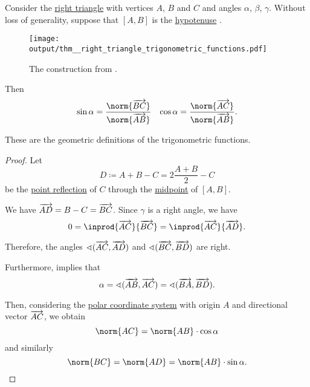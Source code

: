 \begin{proposition}\label{thm:right_triangle_trigonometric_functions}
  Consider the \hyperref[def:triangle/right]{right triangle} with vertices \( A \), \( B \) and \( C \) and angles \( \alpha \), \( \beta \), \( \gamma \). Without loss of generality, suppose that \( [A, B] \) is the \hyperref[thm:right_triangle]{hypotenuse} .

  \begin{figure}[!ht]
    \centering
    \texttt{[image: output/thm\_\_right\_triangle\_trigonometric\_functions.pdf]}
    \caption{The construction from .}\label{fig:thm:right_triangle_trigonometric_functions}
  \end{figure}

  Then
  \begin{align*}
    \sin \alpha = \frac {\norm{\vect{BC}}} {\norm{\vect{AB}}}
    &&
    \cos \alpha = \frac {\norm{\vect{AC}}} {\norm{\vect{AB}}}.
  \end{align*}

  These are the geometric definitions of the trigonometric functions.
\end{proposition}
\begin{proof}
  Let
  \begin{equation*}
    D \coloneqq A + B - C = 2 \frac {A + B} 2 - C
  \end{equation*}
  be the \hyperref[def:rigid_motion/point_reflection]{point reflection} of \( C \) through the \hyperref[def:midpoint]{midpoint} of \( [A, B] \).

  We have \( \overrightarrow{AD} = B - C = \overrightarrow{BC} \). Since \( \gamma \) is a right angle, we have
  \begin{equation*}
    0
    =
    \inprod{\vect{AC}} {\vect{BC}}
    =
    \inprod{\vect{AC}} {\vect{AD}}.
  \end{equation*}

  Therefore, the angles \( \sphericalangle(\overrightarrow{AC},\overrightarrow{AD}) \) and \( \sphericalangle(\overrightarrow{BC},\overrightarrow{BD}) \) are right.

  Furthermore,  implies that
  \begin{equation*}
    \alpha = \sphericalangle(\overrightarrow{AB},\overrightarrow{AC}) = \sphericalangle(\overrightarrow{BA},\overrightarrow{BD}).
  \end{equation*}

  Then, considering the \hyperref[rem:polar_coordinate_system]{polar coordinate system} with origin \( A \) and directional vector \( \overrightarrow{AC} \), we obtain
  \begin{equation*}
    \norm{AC} = \norm{AB} \cdot \cos \alpha
  \end{equation*}
  and similarly
  \begin{equation*}
    \norm{BC} = \norm{AD} = \norm{AB} \cdot \sin \alpha.
  \end{equation*}
\end{proof}

